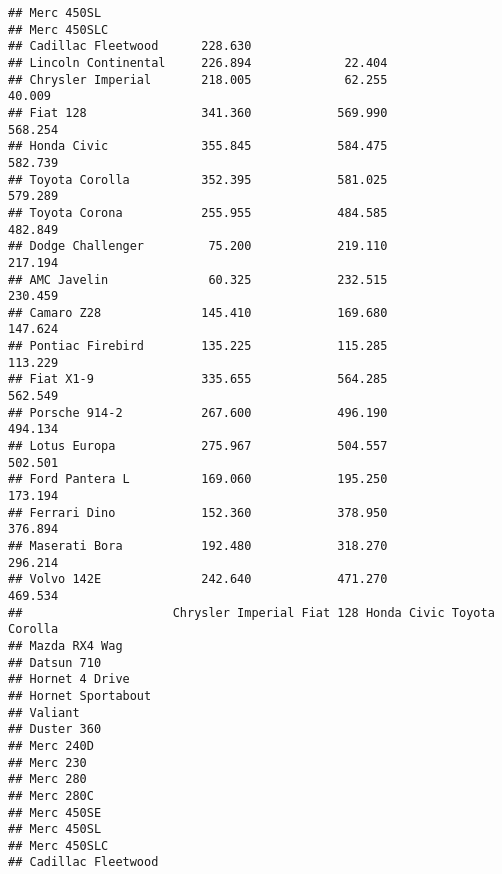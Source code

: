 \documentclass[]{book}
\begin{document}
\begin{verbatim}
## Merc 450SL                                                            
## Merc 450SLC                                                           
## Cadillac Fleetwood      228.630                                       
## Lincoln Continental     226.894             22.404                    
## Chrysler Imperial       218.005             62.255              40.009
## Fiat 128                341.360            569.990             568.254
## Honda Civic             355.845            584.475             582.739
## Toyota Corolla          352.395            581.025             579.289
## Toyota Corona           255.955            484.585             482.849
## Dodge Challenger         75.200            219.110             217.194
## AMC Javelin              60.325            232.515             230.459
## Camaro Z28              145.410            169.680             147.624
## Pontiac Firebird        135.225            115.285             113.229
## Fiat X1-9               335.655            564.285             562.549
## Porsche 914-2           267.600            496.190             494.134
## Lotus Europa            275.967            504.557             502.501
## Ford Pantera L          169.060            195.250             173.194
## Ferrari Dino            152.360            378.950             376.894
## Maserati Bora           192.480            318.270             296.214
## Volvo 142E              242.640            471.270             469.534
##                     Chrysler Imperial Fiat 128 Honda Civic Toyota Corolla
## Mazda RX4 Wag                                                            
## Datsun 710                                                               
## Hornet 4 Drive                                                           
## Hornet Sportabout                                                        
## Valiant                                                                  
## Duster 360                                                               
## Merc 240D                                                                
## Merc 230                                                                 
## Merc 280                                                                 
## Merc 280C                                                                
## Merc 450SE                                                               
## Merc 450SL                                                               
## Merc 450SLC                                                              
## Cadillac Fleetwood                                                       

\end{verbatim}
\end{document}
